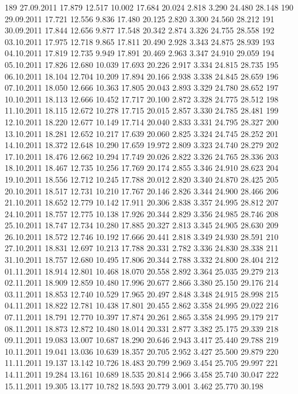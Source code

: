 \documentclass[a4paper,11pt]{scrartcl}
\begin{document}
\begin{Schunk}
\begin{Soutput}
189 27.09.2011 17.879 12.517 10.002 17.684 20.024  2.818  3.290 24.480 28.148
190 29.09.2011 17.721 12.556  9.836 17.480 20.125  2.820  3.300 24.560 28.212
191 30.09.2011 17.844 12.656  9.877 17.548 20.342  2.874  3.326 24.755 28.558
192 03.10.2011 17.975 12.718  9.865 17.811 20.490  2.928  3.343 24.875 28.939
193 04.10.2011 17.819 12.735  9.949 17.891 20.469  2.963  3.347 24.910 29.059
194 05.10.2011 17.826 12.680 10.039 17.693 20.226  2.917  3.334 24.815 28.735
195 06.10.2011 18.104 12.704 10.209 17.894 20.166  2.938  3.338 24.845 28.659
196 07.10.2011 18.050 12.666 10.363 17.805 20.043  2.893  3.329 24.780 28.652
197 10.10.2011 18.113 12.666 10.452 17.717 20.100  2.872  3.328 24.775 28.512
198 11.10.2011 18.115 12.672 10.278 17.715 20.015  2.857  3.330 24.785 28.481
199 12.10.2011 18.220 12.677 10.149 17.714 20.040  2.833  3.331 24.795 28.327
200 13.10.2011 18.281 12.652 10.217 17.639 20.060  2.825  3.324 24.745 28.252
201 14.10.2011 18.372 12.648 10.290 17.659 19.972  2.809  3.323 24.740 28.279
202 17.10.2011 18.476 12.662 10.294 17.749 20.026  2.822  3.326 24.765 28.336
203 18.10.2011 18.467 12.735 10.256 17.769 20.174  2.855  3.346 24.910 28.623
204 19.10.2011 18.556 12.712 10.245 17.788 20.012  2.820  3.340 24.870 28.425
205 20.10.2011 18.517 12.731 10.210 17.767 20.146  2.826  3.344 24.900 28.466
206 21.10.2011 18.652 12.779 10.142 17.911 20.306  2.838  3.357 24.995 28.812
207 24.10.2011 18.757 12.775 10.138 17.926 20.344  2.829  3.356 24.985 28.746
208 25.10.2011 18.747 12.734 10.280 17.885 20.327  2.813  3.345 24.905 28.630
209 26.10.2011 18.572 12.746 10.192 17.666 20.441  2.818  3.349 24.930 28.591
210 27.10.2011 18.831 12.697 10.213 17.788 20.331  2.782  3.336 24.830 28.338
211 31.10.2011 18.757 12.680 10.495 17.806 20.344  2.788  3.332 24.800 28.404
212 01.11.2011 18.914 12.801 10.468 18.070 20.558  2.892  3.364 25.035 29.279
213 02.11.2011 18.909 12.859 10.480 17.996 20.677  2.866  3.380 25.150 29.176
214 03.11.2011 18.853 12.740 10.529 17.965 20.497  2.848  3.348 24.915 28.998
215 04.11.2011 18.822 12.781 10.438 17.801 20.455  2.862  3.358 24.995 29.022
216 07.11.2011 18.791 12.770 10.397 17.874 20.261  2.865  3.358 24.995 29.179
217 08.11.2011 18.873 12.872 10.480 18.014 20.331  2.877  3.382 25.175 29.339
218 09.11.2011 19.083 13.007 10.687 18.290 20.646  2.943  3.417 25.440 29.788
219 10.11.2011 19.041 13.036 10.639 18.357 20.705  2.952  3.427 25.500 29.879
220 11.11.2011 19.137 13.142 10.726 18.483 20.799  2.969  3.454 25.705 29.997
221 14.11.2011 19.284 13.161 10.689 18.535 20.814  2.966  3.458 25.740 30.047
222 15.11.2011 19.305 13.177 10.782 18.593 20.779  3.001  3.462 25.770 30.198

\end{Soutput}
\end{Schunk}
\end{document}
